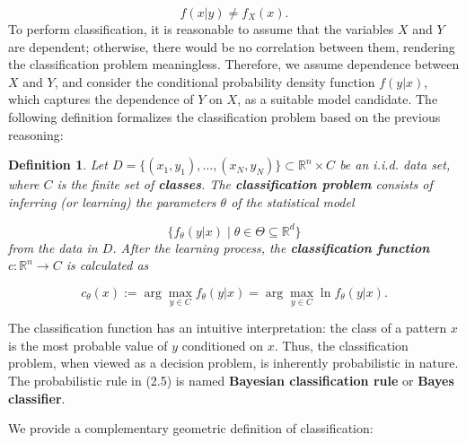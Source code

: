 \documentclass{report}
\newtheorem{definition}{Definition}[chapter]
\begin{document}
\begin{equation}
f(x|y) \neq f_X(x).
\end{equation}
To perform classification, it is reasonable to assume that the variables $X$ and $Y$ are dependent; otherwise, there would be no correlation between them, rendering the classification problem meaningless. Therefore, we assume dependence between $X$ and $Y$, and consider the conditional probability density function $f(y|x)$, which captures the dependence of $Y$ on $X$, as a suitable model candidate. The following definition formalizes the classification problem based on the previous reasoning:

\begin{definition}
Let $D = \{(x_1,y_1),\dots,(x_N,y_N)\} \subset \mathbb{R}^n \times C$ be an i.i.d. data set, where $C$ is the finite set of \textbf{classes}. The \textbf{classification problem} consists of inferring (or learning) the parameters $\theta$ of the statistical model

\begin{equation}
\{f_\theta(y|x) \mid \theta \in \Theta \subseteq \mathbb{R}^d\}
\end{equation}
from the data in $D$. After the learning process, the \textbf{classification function} $c : \mathbb{R}^n \to C$ is calculated as

\begin{equation}
c_\theta(x) := \arg \max_{y \in C} f_\theta(y|x) = \arg \max_{y \in C} \ln f_\theta(y|x).
\end{equation}
\end{definition}
The classification function has an intuitive interpretation: the class of a pattern $x$ is the most probable value of $y$ conditioned on $x$. Thus, the classification problem, when viewed as a decision problem, is inherently probabilistic in nature. The probabilistic rule in (2.5) is named \textbf{Bayesian classification rule} or \textbf{Bayes classifier}.

We provide a complementary geometric definition of classification:
\end{document}
